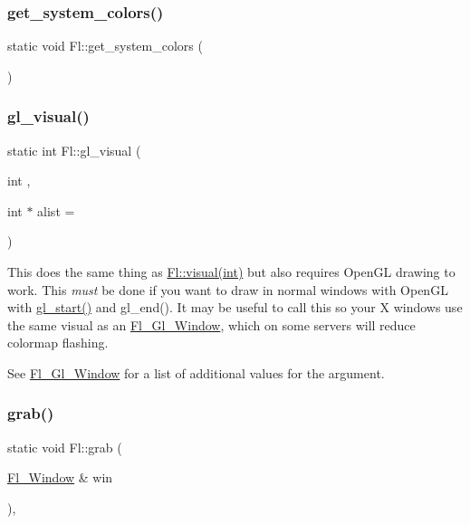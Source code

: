 \mbox{\label{class_fl_af9be9ac8fa2232addd1d3a706c820a83}} 
\subsubsection{\texorpdfstring{get\+\_\+system\+\_\+colors()}{get\_system\_colors()}}
{\footnotesize\ttfamily static void Fl\+::get\+\_\+system\+\_\+colors (\begin{DoxyParamCaption}{ }\end{DoxyParamCaption})\hspace{0.3cm}{\ttfamily [static]}}

\mbox{\label{class_fl_a7a149f42db33b581e1dbe47ffb626abf}} 
\subsubsection{\texorpdfstring{gl\+\_\+visual()}{gl\_visual()}}
{\footnotesize\ttfamily static int Fl\+::gl\+\_\+visual (\begin{DoxyParamCaption}\item[{int}]{,  }\item[{int $\ast$}]{alist = {} }\end{DoxyParamCaption})\hspace{0.3cm}{\ttfamily [static]}}

This does the same thing as \hyperlink{class_fl_a96065665bab374bab4dc61bacccb40d8}{Fl\+::visual(int)} but also requires Open\+GL drawing to work. This {\itshape must} be done if you want to draw in normal windows with Open\+GL with \hyperlink{gl_8h_a9c922d784b80b39b0e64c8f4cfb5d123}{gl\+\_\+start()} and gl\+\_\+end(). It may be useful to call this so your X windows use the same visual as an \hyperlink{class_fl___gl___window}{Fl\+\_\+\+Gl\+\_\+\+Window}, which on some servers will reduce colormap flashing.

See \hyperlink{class_fl___gl___window}{Fl\+\_\+\+Gl\+\_\+\+Window} for a list of additional values for the argument. \mbox{\label{class_fl_ab59edda7c6a51ff2cb4673f21b739088}} 
\subsubsection{\texorpdfstring{grab()}{grab()}}
{\footnotesize\ttfamily static void Fl\+::grab (\begin{DoxyParamCaption}\item[{\hyperlink{class_fl___window}{Fl\+\_\+\+Window} \&}]{win }\end{DoxyParamCaption})\hspace{0.3cm}{\ttfamily [inline]}, {\ttfamily [static]}}


